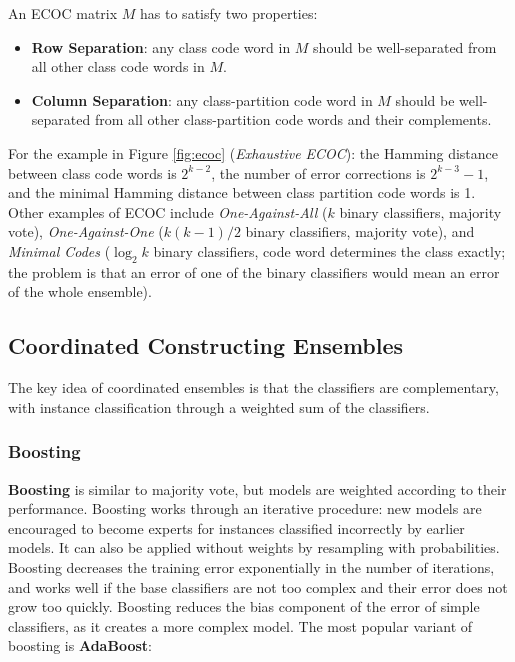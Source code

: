 \documentclass[12pt]{article}
\begin{document}
\noindent
An ECOC matrix $M$ has to satisfy two properties:

\begin{itemize}
    \item \textbf{Row Separation}: any class code word in $M$ should be well-separated from all other class code words in $M$.
    \item \textbf{Column Separation}: any class-partition code word in $M$ should be well-separated from all other class-partition code words and their complements.
\end{itemize}

\noindent
For the example in Figure \ref{fig:ecoc} (\textit{Exhaustive ECOC}): the Hamming distance between class code words is $2^{k-2}$, the number of error corrections is $2^{k-3}-1$, and the minimal Hamming distance between class partition code words is 1.
Other examples of ECOC include \textit{One-Against-All} ($k$ binary classifiers, majority vote), \textit{One-Against-One} ($k(k-1)/2$ binary classifiers, majority vote), and \textit{Minimal Codes} ($\log_2 k$ binary classifiers, code word determines the class exactly; the problem is that an error of one of the binary classifiers would mean an error of the whole ensemble).

\subsection{Coordinated Constructing Ensembles}
The key idea of coordinated ensembles is that the classifiers are complementary, with instance classification through a weighted sum of the classifiers.

\subsubsection{Boosting}
\textbf{Boosting} is similar to majority vote, but models are weighted according to their performance.
Boosting works through an iterative procedure: new models are encouraged to become experts for instances classified incorrectly by earlier models.
It can also be applied without weights by resampling with probabilities.
Boosting decreases the training error exponentially in the number of iterations, and works well if the base classifiers are not too complex and their error does not grow too quickly.
Boosting reduces the bias component of the error of simple classifiers, as it creates a more complex model.
The most popular variant of boosting is \textbf{AdaBoost}:
\end{document}
